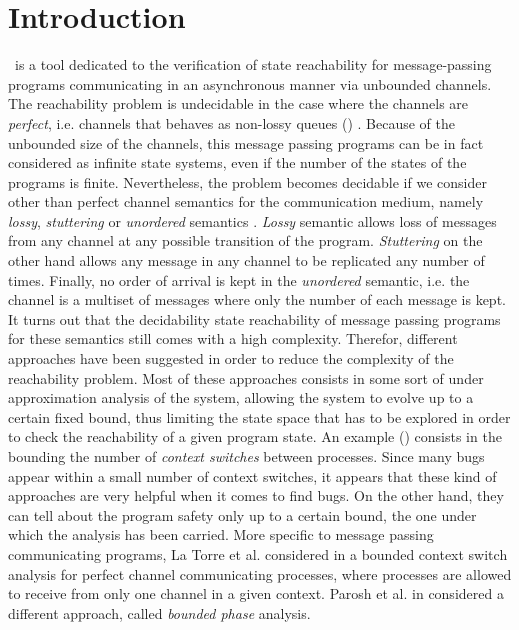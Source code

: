 \section{Introduction}

\MPass\ is a tool dedicated to the verification of state reachability for message-passing programs 
communicating in an asynchronous manner via unbounded channels.
%
The reachability problem is undecidable in the case where the channels are \textit{perfect},
i.e. channels that behaves as non-lossy queues (\cite{BZ83}) .
%
Because of the unbounded size of the channels, this message passing programs can be in fact considered as infinite state systems,
even if the number of the states of the programs is finite.
%
Nevertheless, the problem becomes decidable if we consider other than perfect channel semantics for the communication medium,
namely \textit{lossy}, \textit{stuttering} or \textit{unordered} semantics \cite{AB93,Rack78,phs-IPL2002,lipton}.
\textit{Lossy} semantic allows loss of messages from any channel at any possible transition of the program.
\textit{Stuttering} on the other hand allows any message in any channel to be replicated any number of times.
Finally, no order of arrival is kept in the \textit{unordered} semantic, 
i.e. the channel is a multiset of messages where only the number of each message is kept.
%
It turns out that the decidability state reachability of message passing programs for these semantics
still comes with a high complexity.
%
Therefor, different approaches have been suggested in order to reduce the complexity of the reachability problem.
%
Most of these approaches consists in some sort of under approximation analysis of the system,
allowing the system to evolve up to a certain fixed bound, thus limiting the state space that has to be explored
in order to check the reachability of a given program state.
%
An example (\cite{SJ05}) consists in the bounding the number of \textit{context switches} between processes.
%
Since many bugs appear within a small number of context switches,
it appears that these kind of approaches are very helpful when it comes to find bugs.
%
On the other hand, they can tell about the program safety only up to a certain bound, the one under which the analysis has been carried.
%
More specific to message passing communicating programs,
La Torre et al. considered in \cite{LaTorre08} a bounded context switch analysis for perfect channel communicating processes,
where processes are allowed to receive from only one channel in a given context.
%
Parosh et al. in \cite{AAC13} considered a different approach, called \textit{bounded phase} analysis.
